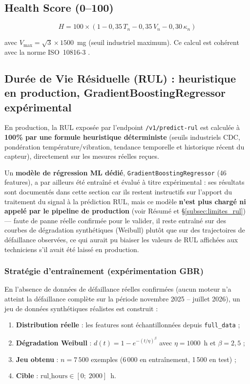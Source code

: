 \documentclass[12pt,a4paper]{report}
\begin{document}
\subsection{Health Score (0--100)}

\begin{equation}
  H = 100 \times (1 - 0{,}35\,T_n - 0{,}35\,V_n - 0{,}30\,\kappa_n)
\end{equation}

avec $V_{\text{max}} = \sqrt{3} \times 1500$~mg (seuil industriel maximum).
Ce calcul est cohérent avec la norme ISO~10816-3 \cite{iso10816}.

\subsection{Durée de Vie Résiduelle (RUL) : heuristique en production, GradientBoostingRegressor expérimental}
\label{subsec:rul_gbr}

En production, la RUL exposée par l'endpoint \texttt{/v1/predict-rul} est calculée à
\textbf{100\% par une formule heuristique déterministe} (seuils industriels CDC,
pondération température/vibration, tendance temporelle et historique récent du capteur),
directement sur les mesures réelles reçues.

Un \textbf{modèle de régression ML dédié}, \texttt{GradientBoostingRegressor}
\cite{friedman2001} (46 features), a par ailleurs été entraîné et évalué à titre
expérimental : ses résultats sont documentés dans cette section car ils restent
instructifs sur l'apport du traitement du signal à la prédiction RUL, mais ce modèle
\textbf{n'est plus chargé ni appelé par le pipeline de production} (voir Résumé et
\S\ref{subsec:limites_rul}) — faute de panne réelle confirmée pour le valider, il reste
entraîné sur des courbes de dégradation synthétiques (Weibull) plutôt que sur des
trajectoires de défaillance observées, ce qui aurait pu biaiser les valeurs de RUL
affichées aux techniciens s'il avait été laissé en production.

\subsubsection{Stratégie d'entraînement (expérimentation GBR)}

En l'absence de données de défaillance réelles confirmées (aucun moteur n'a atteint
la défaillance complète sur la période novembre 2025 -- juillet 2026), un jeu de données
synthétiques réalistes est construit :

\begin{enumerate}
  \item \textbf{Distribution réelle} : les features sont échantillonnées depuis \texttt{full\_data} ;
  \item \textbf{Dégradation Weibull} \cite{weibull1951} : $d(t) = 1 - e^{-(t/\eta)^\beta}$ avec $\eta=1000$~h et $\beta=2{,}5$ ;
  \item \textbf{Jeu obtenu} : $n = 7\,500$ exemples (6\,000 en entraînement, 1\,500 en test) ;
  \item \textbf{Cible} : $\text{rul\_hours} \in [0;\; 2000]$~h.
\end{enumerate}
\end{document}

